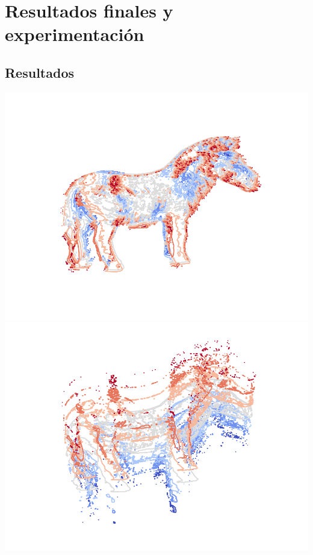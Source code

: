 \section{Resultados finales y experimentación}
\subsection{Resultados}

{\centering
    \includegraphics[scale=0.6]{informe/imagenes/supnivel/supNivelCaballoLucesPropias578N1.pdf} \\
}
{\centering
    \includegraphics[scale=0.6]{informe/imagenes/supnivel/supNivelCaballoLucesPropias578N2.pdf} \\
}
